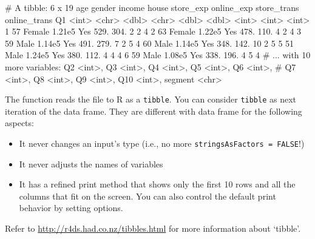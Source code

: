 \documentclass[
  12pt,
]{krantz}
\makeatletter
\newenvironment{Shaded}{\begin{snugshade}}{\end{snugshade}}
\newcommand{\NormalTok}[1]{#1}
\providecommand{\tightlist}{%
  \setlength{\itemsep}{0pt}\setlength{\parskip}{0pt}}
\newenvironment{kframe}{%
\medskip{}
\setlength{\fboxsep}{.8em}
 \def\at@end@of@kframe{}%
 \ifinner\ifhmode%
  \def\at@end@of@kframe{\end{minipage}}%
  \begin{minipage}{\columnwidth}%
 \fi\fi%
 \def\FrameCommand##1{\hskip\@totalleftmargin \hskip-\fboxsep
 \colorbox{shadecolor}{##1}\hskip-\fboxsep
     \hskip-\linewidth \hskip-\@totalleftmargin \hskip\columnwidth}%
 \MakeFramed {\advance\hsize-\width
   \@totalleftmargin\z@ \linewidth\hsize
   \@setminipage}}%
 {\par\unskip\endMakeFramed%
 \at@end@of@kframe}
\renewenvironment{Shaded}{\begin{kframe}}{\end{kframe}}
\makeatother
\begin{document}
\begin{Shaded}
\begin{Highlighting}[]
\NormalTok{\# A tibble: 6 x 19}
\NormalTok{    age gender income house store\_exp online\_exp store\_trans online\_trans    Q1}
\NormalTok{  \textless{}int\textgreater{} \textless{}chr\textgreater{}   \textless{}dbl\textgreater{} \textless{}chr\textgreater{}     \textless{}dbl\textgreater{}      \textless{}dbl\textgreater{}       \textless{}int\textgreater{}        \textless{}int\textgreater{} \textless{}int\textgreater{}}
\NormalTok{1    57 Female 1.21e5 Yes        529.       304.           2            2     4}
\NormalTok{2    63 Female 1.22e5 Yes        478.       110.           4            2     4}
\NormalTok{3    59 Male   1.14e5 Yes        491.       279.           7            2     5}
\NormalTok{4    60 Male   1.14e5 Yes        348.       142.          10            2     5}
\NormalTok{5    51 Male   1.24e5 Yes        380.       112.           4            4     4}
\NormalTok{6    59 Male   1.08e5 Yes        338.       196.           4            5     4}
\NormalTok{\# ... with 10 more variables: Q2 \textless{}int\textgreater{}, Q3 \textless{}int\textgreater{}, Q4 \textless{}int\textgreater{}, Q5 \textless{}int\textgreater{}, Q6 \textless{}int\textgreater{},}
\NormalTok{\#   Q7 \textless{}int\textgreater{}, Q8 \textless{}int\textgreater{}, Q9 \textless{}int\textgreater{}, Q10 \textless{}int\textgreater{}, segment \textless{}chr\textgreater{}}
\end{Highlighting}
\end{Shaded}

The function reads the file to R as a \texttt{tibble}. You can consider \texttt{tibble} as next iteration of the data frame. They are different with data frame for the following aspects:

\begin{itemize}
\tightlist
\item
  It never changes an input's type (i.e., no more \texttt{stringsAsFactors\ =\ FALSE}!)
\item
  It never adjusts the names of variables
\item
  It has a refined print method that shows only the first 10 rows and all the columns that fit on the screen. You can also control the default print behavior by setting options.
\end{itemize}

Refer to \url{http://r4ds.had.co.nz/tibbles.html} for more information about `tibble'.
\end{document}
